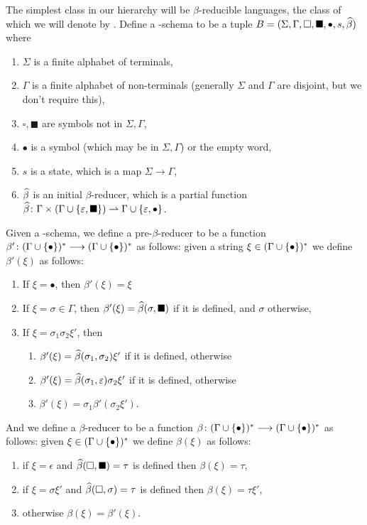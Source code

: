 \documentclass{llncs}
\begin{document}
The simplest class in our hierarchy will be $\beta$-reducible languages, the class of which we will denote by \BR.
Define a \BR-schema to be a tuple $B=(\Sigma,\Gamma,\square,\blacksquare,\bullet,s,\widehat\beta)$ where
\begin{enumerate}
    \item $\Sigma$ is a finite alphabet of terminals,
    \item $\Gamma$ is a finite alphabet of non-terminals (generally $\Sigma$ and $\Gamma$ are disjoint, but we don't require this),
    \item $\square,\blacksquare$ are symbols not in $\Sigma,\Gamma$,
    \item $\bullet$ is a symbol (which may be in $\Sigma,\Gamma$) or the empty word,
    \item $s$ is a state, which is a map $\Sigma\to\Gamma$,
    \item $\widehat\beta$ is an initial $\beta$-reducer, which is a partial function $\hb\colon\Gamma\times(\Gamma\cup\set{\epsilon,\blacksquare})\partial\Gamma\cup\set{\epsilon,\bullet}$.
\end{enumerate}
Given a \BR-schema, we define a pre-$\beta$-reducer to be a function $\beta'\colon(\Gamma\cup\set\bullet)^*\longto(\Gamma\cup\set\bullet)^*$ as follows: given a string $\xi\in(\Gamma\cup\set\bullet)^*$ we define $\beta'(\xi)$ as follows:
\begin{enumerate}
    \item If $\xi=\bullet$, then $\beta'(\xi)=\xi$
    \item If $\xi=\sigma\in\Gamma$, then $\beta'(\xi)=\widehat\beta(\sigma,\blacksquare)$ if it is defined, and $\sigma$ otherwise,
    \item If $\xi=\sigma_1\sigma_2\xi'$, then
        \begin{enumerate}
            \item $\beta'(\xi)=\widehat\beta(\sigma_1,\sigma_2)\xi'$ if it is defined, otherwise
            \item $\beta'(\xi)=\widehat\beta(\sigma_1,\varepsilon)\sigma_2\xi'$ if it is defined, otherwise
            \item $\beta'(\xi)=\sigma_1\beta'(\sigma_2\xi')$.
        \end{enumerate}
\end{enumerate}
And we define a $\beta$-reducer to be a function $\beta\colon(\Gamma\cup\set\bullet)^*\longto(\Gamma\cup\set\bullet)^*$ as follows: given $\xi\in(\Gamma\cup\set\bullet)^*$ we define $\beta(\xi)$ as follows:
\begin{enumerate}
    \item if $\xi=\epsilon$ and $\widehat\beta(\square,\blacksquare)=\tau$ is defined then $\beta(\xi)=\tau$,
    \item if $\xi=\sigma\xi'$ and $\widehat\beta(\square,\sigma)=\tau$ is defined then $\beta(\xi)=\tau\xi'$,
    \item otherwise $\beta(\xi)=\beta'(\xi)$.
\end{enumerate}
\end{document}
